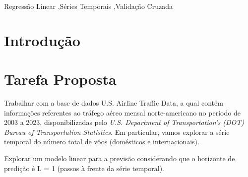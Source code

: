 \documentclass[final,5p]{elsarticle}
\numberwithin{equation}{section}
\begin{document}
\begin{frontmatter}

\begin{keyword}
    Regressão Linear \sep Séries Temporais \sep Validação Cruzada



\end{keyword}

\end{frontmatter}

\section{Introdução}


\section{Tarefa Proposta}

    Trabalhar com a base de dados U.S. Airline Traffic Data, a qual contém informações referentes ao tráfego aéreo mensal norte-americano no período de 2003 a 2023, disponibilizadas pelo \emph{U.S. Department of Transportation’s (DOT) Bureau of Transportation Statistics}. Em particular, vamos explorar a série temporal do número total de vôos (domésticos e internacionais).

    Explorar um modelo linear para a previsão considerando que o horizonte de predição é L = 1 (passos à frente da série temporal).
\end{document}
